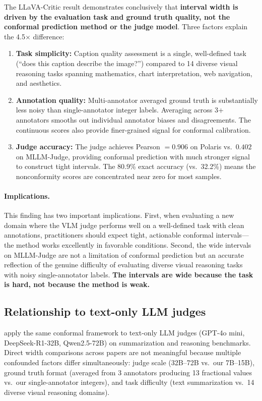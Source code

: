 \documentclass{article}
\begin{document}
The LLaVA-Critic result demonstrates conclusively that \textbf{interval width is driven by the evaluation task and ground truth quality, not the conformal prediction method or the judge model}. Three factors explain the 4.5$\times$ difference:

\begin{enumerate}[leftmargin=*,itemsep=1pt,topsep=2pt]
\item \textbf{Task simplicity:} Caption quality assessment is a single, well-defined task (``does this caption describe the image?'') compared to 14 diverse visual reasoning tasks spanning mathematics, chart interpretation, web navigation, and aesthetics.
\item \textbf{Annotation quality:} Multi-annotator averaged ground truth is substantially less noisy than single-annotator integer labels. Averaging across 3+ annotators smooths out individual annotator biases and disagreements. The continuous scores also provide finer-grained signal for conformal calibration.
\item \textbf{Judge accuracy:} The judge achieves Pearson $= 0.906$ on Polaris vs.\ $0.402$ on MLLM-Judge, providing conformal prediction with much stronger signal to construct tight intervals. The 80.9\% exact accuracy (vs.\ 32.2\%) means the nonconformity scores are concentrated near zero for most samples.
\end{enumerate}

\paragraph{Implications.} This finding has two important implications. First, when evaluating a new domain where the VLM judge performs well on a well-defined task with clean annotations, practitioners should expect tight, actionable conformal intervals---the method works excellently in favorable conditions. Second, the wide intervals on MLLM-Judge are not a limitation of conformal prediction but an accurate reflection of the genuine difficulty of evaluating diverse visual reasoning tasks with noisy single-annotator labels. \textbf{The intervals are wide because the task is hard, not because the method is weak.}

\subsection{Relationship to text-only LLM judges}
\label{sec:llm_comparison}

\citet{sheng2025analyzing} apply the same conformal framework to text-only LLM judges (GPT-4o mini, DeepSeek-R1-32B, Qwen2.5-72B) on summarization and reasoning benchmarks. Direct width comparisons across papers are not meaningful because multiple confounded factors differ simultaneously: judge scale (32B--72B vs.\ our 7B--15B), ground truth format (averaged from 3 annotators producing 13 fractional values vs.\ our single-annotator integers), and task difficulty (text summarization vs.\ 14 diverse visual reasoning domains).
\end{document}
